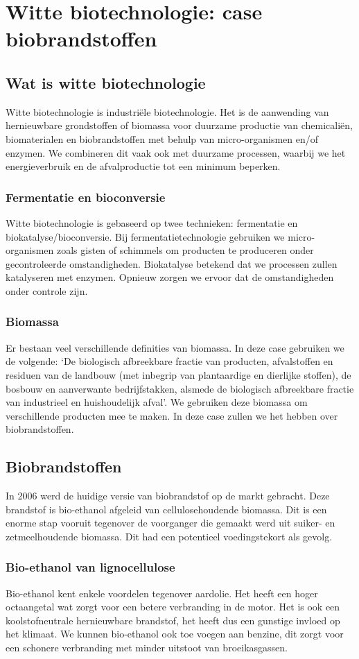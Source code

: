 \documentclass[a4paper,kul]{kulakarticle} %
\begin{document}
\section{Witte biotechnologie: case biobrandstoffen}
\label{sec:biobrandstoffen}
\subsection{Wat is witte biotechnologie}
Witte biotechnologie is industriële biotechnologie. Het is de aanwending van hernieuwbare grondstoffen of biomassa voor duurzame productie van chemicaliën, biomaterialen en biobrandstoffen met behulp van micro-organismen en/of enzymen. We combineren dit vaak ook met duurzame processen, waarbij we het energieverbruik en de afvalproductie tot een minimum beperken. 
\subsubsection{Fermentatie en bioconversie}
Witte biotechnologie is gebaseerd op twee technieken: fermentatie en biokatalyse/bioconversie. Bij fermentatietechnologie gebruiken we micro-organismen zoals gisten of schimmels om producten te produceren onder gecontroleerde omstandigheden. Biokatalyse betekend dat we processen zullen katalyseren met enzymen. Opnieuw zorgen we ervoor dat de omstandigheden onder controle zijn. 
\subsubsection{Biomassa}
Er bestaan veel verschillende definities van biomassa. In deze case gebruiken we de volgende: `De biologisch afbreekbare fractie van producten, afvalstoffen en residuen van de landbouw (met inbegrip van plantaardige en dierlijke stoffen), de bosbouw en aanverwante bedrijfstakken, alsmede de biologisch afbreekbare fractie van industrieel en huishoudelijk afval'. We gebruiken deze biomassa om verschillende producten mee te maken. In deze case zullen we het hebben over biobrandstoffen. 
\subsection{Biobrandstoffen}
In 2006 werd de huidige versie van biobrandstof op de markt gebracht. Deze brandstof is bio-ethanol afgeleid van cellulosehoudende biomassa. Dit is een enorme stap vooruit tegenover de voorganger die gemaakt werd uit suiker- en zetmeelhoudende biomassa. Dit had een potentieel voedingstekort als gevolg. 
\subsubsection{Bio-ethanol van lignocellulose}
Bio-ethanol kent enkele voordelen tegenover aardolie. Het heeft een hoger octaangetal wat zorgt voor een betere verbranding in de motor. Het is ook een koolstofneutrale hernieuwbare brandstof, het heeft dus een gunstige invloed op het klimaat. We kunnen bio-ethanol ook toe voegen aan benzine, dit zorgt voor een schonere verbranding met minder uitstoot van broeikasgassen.
\end{document}
